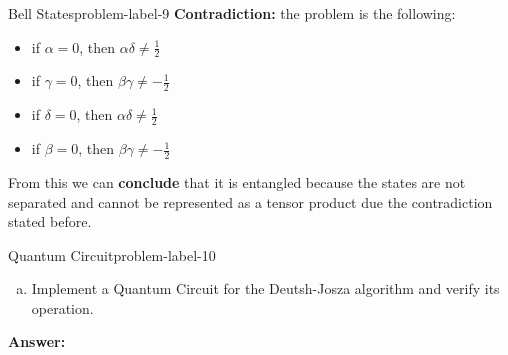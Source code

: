 \begin{problem}{Bell States}{problem-label-9}
	\textbf{Contradiction:} the problem is the following:
	\begin{itemize}
		\item if $\alpha = 0$, then $\alpha\delta \not= \frac{1}{2}$
		\item if $\gamma = 0$, then $\beta\gamma \not= -\frac{1}{2}$
		\item if $\delta = 0$, then $\alpha\delta \not= \frac{1}{2}$
		\item if $\beta = 0$, then $\beta\gamma \not= -\frac{1}{2}$
	\end{itemize}
		
			From this we can \textbf{conclude} that it is entangled because the states are not separated and cannot be represented as a tensor product due the contradiction stated before.
\end{problem}


\begin{problem}{Quantum Circuit}{problem-label-10}
	
	\begin{enumerate}[(a)]
		\item Implement a Quantum Circuit for the Deutsh-Josza algorithm and verify its operation.
	\end{enumerate}
	\textbf{Answer:}
\end{problem}







%
%

